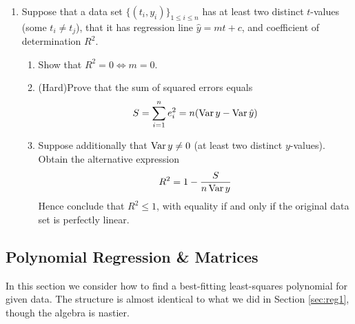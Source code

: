 \begin{exercises}{}{}
\begin{enumerate}
	  
	  \item\label{exs:Rsqalt} Suppose that a data set $\big\{(t_i,y_i)\big\}_{1\le i\le n}$ has at least two distinct $t$-values (some $t_i\neq t_j$), that it has regression line $\hat y=mt+c$, and coefficient of determination $R^2$.
	  \begin{enumerate}
	    \item Show that $R^2=0\Longleftrightarrow m=0$.
	    \item (Hard)\lstsp Prove that the sum of squared errors equals
	    \[
	    	S=\sum_{i=1}^ne_i^2 =n(\operatorname{Var} y-\operatorname{Var}\hat y)
	    \]
	    \item Suppose additionally that $\operatorname{Var} y\neq 0$ (at least two distinct $y$-values). Obtain the alternative expression
	    \[
	    	R^2=1-\frac S{n\operatorname{Var} y}
	    \]
	    Hence conclude that $R^2\le 1$, with equality if and only if the original data set is perfectly linear.
		\end{enumerate}	
	\end{enumerate}

\end{exercises}

\clearpage



\subsection{Polynomial Regression \& Matrices}\label{sec:regpoly}

In this section we consider how to find a best-fitting least-squares polynomial for given data. The structure is almost identical to what we did in Section \ref{sec:reg1}, though the algebra is nastier.\smallbreak

